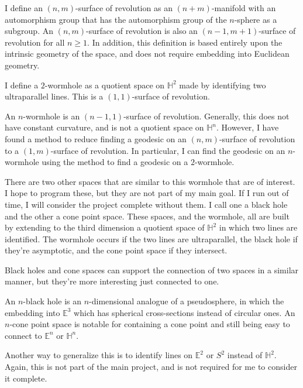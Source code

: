 I define an $(n,m)$-surface of revolution as an $(n+m)$-manifold with an automorphism group that has the automorphism group of the $n$-sphere as a subgroup. An $(n,m)$-surface of revolution is also an $(n-1,m+1)$-surface of revolution for all $n \geq 1$. In addition, this definition is based entirely upon the intrinsic geometry of the space, and does not require embedding into Euclidean geometry.


I define a $2$-wormhole as a quotient space on $\mathbb{H}^2$ made by identifying two ultraparallel lines. This is a $(1,1)$-surface of revolution.

An $n$-wormhole is an $(n-1,1)$-surface of revolution. Generally, this does not have constant curvature, and is not a quotient space on $\mathbb{H}^n$. However, I have found a method to reduce finding a geodesic on an $(n,m)$-surface of revolution to a $(1,m)$-surface of revolution. In particular, I can find the geodesic on an $n$-wormhole using the method to find a geodesic on a $2$-wormhole.

There are two other spaces that are similar to this wormhole that are of interest. I hope to program these, but they are not part of my main goal. If I run out of time, I will consider the project complete without them. I call one a black hole and the other a cone point space. These spaces, and the wormhole, all are built by extending to the third dimension a quotient space of $\mathbb{H}^2$ in which two lines are identified. The wormhole occurs if the two lines are ultraparallel, the black hole if they're asymptotic, and the cone point space if they intersect.

Black holes and cone spaces can support the connection of two spaces in a similar manner, but they're more interesting just connected to one.  An $n$-black hole is an $n$-dimensional analogue of a pseudosphere, in which the embedding into $\mathbb{E}^3$ which has spherical cross-sections instead of circular ones. An $n$-cone point space is notable for containing a cone point and still being easy to connect to $\mathbb{E}^n$ or $\mathbb{H}^n$.

Another way to generalize this is to identify lines on $\mathbb{E}^2$ or $S^2$ instead of $\mathbb{H}^2$. Again, this is not part of the main project, and is not required for me to consider it complete.

